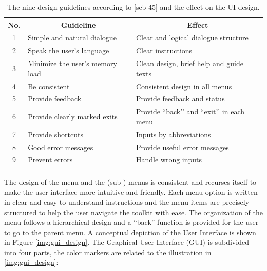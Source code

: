 \begin{table}[!ht]
\begin{center}
\begin{tabular}{cll}
\toprule
\multicolumn{1}{c}{\textbf{No.}} &\multicolumn{1}{c}{\textbf{Guideline}} & \multicolumn{1}{c}{\textbf{Effect}}\\
\midrule
\hline
1 & Simple and natural dialogue & Clear and logical dialogue structure\\

2 & Speak the user’s language & Clear instructions\\

3 & Minimize the user’s memory load & Clean design, brief help and guide texts\\

4 & Be consistent & Consistent design in all menus\\

5 & Provide feedback & Provide feedback and status\\

6 & Provide clearly marked exits & Provide ``back’’ and ``exit’’ in each menu\\

7 & Provide shortcuts & Inputs by abbreviations \\

8 & Good error messages & Provide useful error messages\\

9 & Prevent errors & Handle wrong inputs \\
\hline
\addlinespace
\bottomrule
\end{tabular}
\end{center}
\caption{The nine design guidelines according to [seb 45] and the effect on the UI design.}
\label{tab:guidline_design}
\end{table}

The design of the menu and the (sub-) menus is consistent and recurses itself to make the user interface more intuitive and friendly. Each menu option is written in clear and easy to understand instructions and the menu items are precisely structured to help the user navigate the toolkit with ease. The organization of the menu follows a hierarchical design and a ``back'' function is provided for the user to go to the parent menu. A conceptual depiction of the User Interface is shown in Figure
\ref{img:gui_design}. The Graphical User Interface (GUI) is subdivided into four parts, the color markers are related to the illustration in \ref{img:gui_design}:

